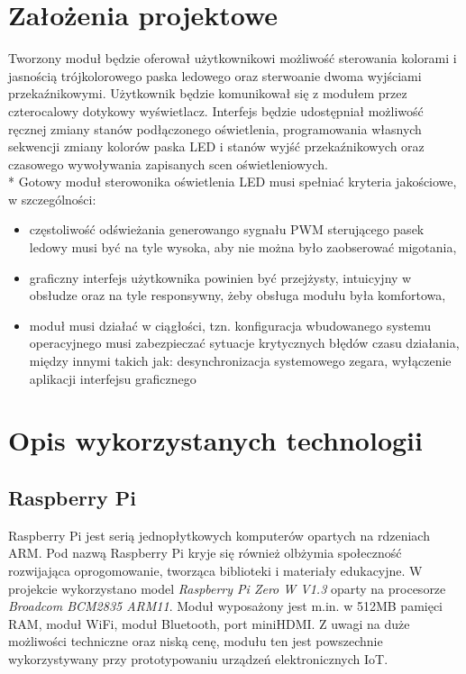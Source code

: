 \documentclass[12pt, eng, twoside, openany, final]{mgr}
\begin{document}
\chapter{Założenia projektowe}
\thispagestyle{fancy}  
    Tworzony moduł będzie oferował użytkownikowi możliwość sterowania kolorami i jasnością trójkolorowego paska ledowego oraz sterwoanie dwoma wyjściami przekaźnikowymi. Użytkownik będzie komunikował się z modułem przez czterocalowy dotykowy wyświetlacz. Interfejs będzie udostępniał możliwość ręcznej zmiany stanów podłączonego oświetlenia, programowania własnych sekwencji zmiany kolorów paska LED i stanów wyjść przekaźnikowych oraz czasowego wywoływania zapisanych scen oświetleniowych.\\*
    Gotowy moduł sterowonika oświetlenia LED musi spełniać kryteria jakościowe, w szczególności:
    \begin{itemize}
        \item częstoliwość odświeżania generowango sygnału PWM sterującego pasek ledowy musi być na tyle wysoka, aby nie można było zaobserować migotania,
        
        \item graficzny interfejs użytkownika powinien być przejżysty, intuicyjny w obsłudze oraz na tyle responsywny, żeby
        obsługa modułu była komfortowa,
        
        \item moduł musi działać w ciągłości, tzn. konfiguracja wbudowanego systemu operacyjnego musi zabezpieczać sytuacje
        krytycznych błędów czasu działania, między innymi takich jak: desynchronizacja systemowego zegara, wyłączenie aplikacji interfejsu graficznego
    \end{itemize}
%
\chapter{Opis wykorzystanych technologii}
\thispagestyle{fancy}
    \section{Raspberry Pi}
    Raspberry Pi jest serią jednopłytkowych komputerów opartych na rdzeniach ARM. Pod nazwą Raspberry Pi kryje się również olbżymia społeczność rozwijająca oprogomowanie, tworząca biblioteki i materiały edukacyjne.
    W projekcie wykorzystano model \emph{Raspberry Pi Zero W V1.3} oparty na procesorze  \emph{Broadcom BCM2835 ARM11}. Moduł wyposażony jest m.in. w 512MB pamięci RAM, moduł WiFi, moduł Bluetooth, port miniHDMI. Z uwagi na  duże możliwości techniczne oraz niską cenę, modułu ten jest powszechnie wykorzystywany przy prototypowaniu urządzeń elektronicznych IoT.
    
\end{document}
